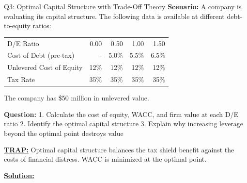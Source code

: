 \documentclass{beamer}
\renewcommand{\scriptsize}{\fontsize{6pt}{7pt}\selectfont}
\begin{document}
	\begin{frame}{Q3: Optimal Capital Structure with Trade-Off Theory}
		\scriptsize
		\textbf{Scenario:} A company is evaluating its capital structure. The following data is available at different debt-to-equity ratios:
		
		\begin{tabular}{lrrrr}
			D/E Ratio & 0.00 & 0.50 & 1.00 & 1.50 \\
			Cost of Debt (pre-tax) & - & 5.0\% & 5.5\% & 6.5\% \\
			Unlevered Cost of Equity & 12\% & 12\% & 12\% & 12\% \\
			Tax Rate & 35\% & 35\% & 35\% & 35\% \\
		\end{tabular}
		
		The company has \$50 million in unlevered value.
		
		\textbf{Question:}
		1. Calculate the cost of equity, WACC, and firm value at each D/E ratio
		2. Identify the optimal capital structure
		3. Explain why increasing leverage beyond the optimal point destroys value
		
		\vspace{2pt}
		\underline{\textbf{TRAP:}} Optimal capital structure balances the tax shield benefit against the costs of financial distress. WACC is minimized at the optimal point.
		
		\vspace{4pt}
		\underline{\textbf{Solution:}}
	\end{frame}
	
\end{document}
